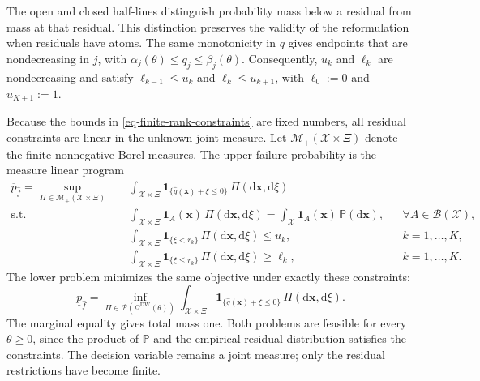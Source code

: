 \documentclass[review,11pt,3p,authoryear,nopreprintline]{elsarticle}
\begin{document}
The open and closed half-lines distinguish probability mass below a residual from mass at that residual. This distinction preserves the validity of the reformulation when residuals have atoms. The same monotonicity in $q$ gives endpoints that are nondecreasing in $j$, with $\alpha_j(\theta)\le q_j\le\beta_j(\theta)$. Consequently, $u_k$ and $\ell_k$ are nondecreasing and satisfy $\ell_{k-1}\le u_k$ and $\ell_k\le u_{k+1}$, with $\ell_0:=0$ and $u_{K+1}:=1$.

Because the bounds in \eqref{eq-finite-rank-constraints} are fixed numbers, all residual constraints are linear in the unknown joint measure. Let $\mathcal M_+(\mathcal X\times\Xi)$ denote the finite nonnegative Borel measures. The upper failure probability is the measure linear program
\begin{equation}
  \begin{aligned}
    \overline p_{\hat f}
    =\sup_{\Pi\in\mathcal M_+(\mathcal X\times\Xi)}\quad&
    \int_{\mathcal X\times\Xi}
    \mathbf1_{\{\hat g(\bm x)+\xi\le0\}}\,\Pi\left(\mathrm d\bm x,\mathrm d\xi\right)\\
    \text{s.t.}\quad&
    \int_{\mathcal X\times\Xi}\mathbf1_A(\bm x)\,\Pi\left(\mathrm d\bm x,\mathrm d\xi\right)
    =\int_{\mathcal X}\mathbf1_A(\bm x)\,\mathbb P\left(\mathrm d\bm x\right),
    &&\forall A\in\mathcal B(\mathcal X),\\
    &\int_{\mathcal X\times\Xi}\mathbf1_{\{\xi<r_k\}}\,\Pi\left(\mathrm d\bm x,\mathrm d\xi\right)\le u_k,
    &&k=1,\ldots,K,\\
    &\int_{\mathcal X\times\Xi}\mathbf1_{\{\xi\le r_k\}}\,\Pi\left(\mathrm d\bm x,\mathrm d\xi\right)\ge\ell_k,
    &&k=1,\ldots,K.
  \end{aligned}
  \label{eq-measure-upper}
\end{equation}
The lower problem minimizes the same objective under exactly these constraints:
\begin{equation}
  \underline p_{\hat f}
  =\inf_{\Pi\in\mathscr P\left(\mathscr Q^{\mathrm{DW}}(\theta)\right)}
  \int_{\mathcal X\times\Xi}\mathbf1_{\{\hat g(\bm x)+\xi\le0\}}\,\Pi\left(\mathrm d\bm x,\mathrm d\xi\right).
  \label{eq-measure-lower}
\end{equation}
The marginal equality gives total mass one. Both problems are feasible for every $\theta\ge0$, since the product of $\mathbb P$ and the empirical residual distribution satisfies the constraints. The decision variable remains a joint measure; only the residual restrictions have become finite.
\end{document}
